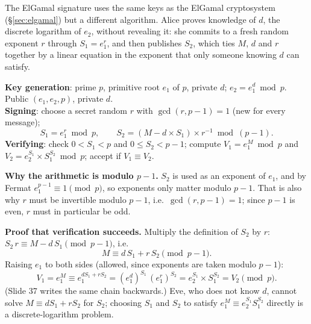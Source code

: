 The ElGamal signature uses the same keys as the ElGamal cryptosystem (\S\ref{sec:elgamal}) but a different algorithm. Alice proves knowledge of $d$, the discrete logarithm of $e_2$, without revealing it: she commits to a fresh random exponent $r$ through $S_1 = e_1^r$, and then publishes $S_2$, which ties $M$, $d$ and $r$ together by a linear equation in the exponent that only someone knowing $d$ can satisfy.

\begin{mustknow}
\textbf{Key generation}: prime $p$, primitive root $e_1$ of $p$, private $d$; $e_2 = e_1^d \bmod p$. Public $(e_1, e_2, p)$, private $d$.\\
\textbf{Signing}: choose a secret random $r$ with $\gcd(r, p-1) = 1$ (new for every message);
\[
S_1 = e_1^r \bmod p, \qquad S_2 = (M - d \times S_1) \times r^{-1} \bmod (p-1).
\]
\textbf{Verifying}: check $0 < S_1 < p$ and $0 \le S_2 < p - 1$; compute $V_1 = e_1^M \bmod p$ and $V_2 = e_2^{S_1} \times S_1^{S_2} \bmod p$; accept if $V_1 \equiv V_2$.
\end{mustknow}

\textbf{Why the arithmetic is modulo $p - 1$.} $S_2$ is used as an exponent of $e_1$, and by Fermat $e_1^{p-1} \equiv 1 \pmod p$, so exponents only matter modulo $p - 1$. That is also why $r$ must be invertible modulo $p - 1$, i.e.\ $\gcd(r, p - 1) = 1$; since $p - 1$ is even, $r$ must in particular be odd.

\textbf{Proof that verification succeeds.} Multiply the definition of $S_2$ by $r$: $S_2\, r \equiv M - d\,S_1 \pmod{p-1}$, i.e.
\[
M \equiv d\,S_1 + r\,S_2 \pmod{p-1}.
\]
Raising $e_1$ to both sides (allowed, since exponents are taken modulo $p - 1$):
\[
V_1 = e_1^{M} \equiv e_1^{d S_1 + r S_2} = (e_1^d)^{S_1}\,(e_1^r)^{S_2} = e_2^{S_1} \times S_1^{S_2} = V_2 \pmod p .
\]
(Slide 37 writes the same chain backwards.) Eve, who does not know $d$, cannot solve $M \equiv d S_1 + r S_2$ for $S_2$; choosing $S_1$ and $S_2$ to satisfy $e_1^M \equiv e_2^{S_1} S_1^{S_2}$ directly is a discrete-logarithm problem.

